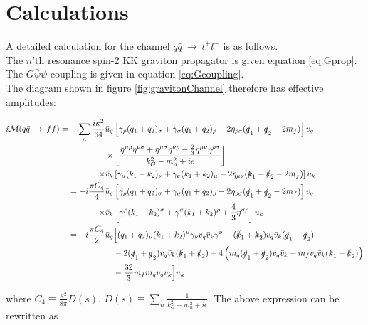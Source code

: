 \documentclass[11pt,a4paper]{article}
\begin{document}
\appendix
\section{Calculations}
A detailed calculation for the channel $q\bar{q}\:\rightarrow\:l^+l^-$ is as follows.\\
The $n$'th resonance spin-2 KK graviton propagator is given equation \ref{eq:Gprop}. The $G\bar{\psi}\psi$-coupling is given in equation \ref{eq:Gcoupling}.\\
The diagram shown in figure \ref{fig:gravitonChannel} therefore has effective amplitudes:

\begin{align}
	\begin{split}
	i\mathcal{M}(q\bar{q}\:\rightarrow\:f\bar{f}) = -\sum_{n}\frac{i\kappa^2}{64}\bar{u}_q&\left[\gamma_\rho(q_1 + q_2)_\sigma + \gamma_\sigma(q_1+q_2)_\rho - 2\eta_{\rho\sigma}(\slashed q_1 + \slashed q_2 - 2m_f)\right]v_q\\
	\times&\left[\frac{\eta^{\mu\rho}\eta^{\nu\sigma} + \eta^{\mu\sigma}\eta^{\nu\rho} - \frac{2}{3}\eta^{\mu\nu}\eta^{\rho\sigma}}{k_G^2 - m_n^2 + i\epsilon}\right]\\
	\times\bar{v}_k&\left[\gamma_\mu(k_1 + k_2)_\nu + \gamma_\nu(k_1+k_2)_\mu - 2\eta_{\mu\nu}(\slashed k_1 + \slashed k_2 - 2m_f)\right]u_k\\
	= -i\frac{\pi C_4}{4}\bar{u}_q&\left[\gamma_\rho(q_1 + q_2)_ \sigma + \gamma_\sigma(q_1+q_2)_\rho - 2\eta_{\rho\sigma}(\slashed q_1 + \slashed q_2 - 2m_f)\right]v_q\\
	\times\bar{v}_k&\left[\gamma^\rho(k_1 + k_2)^\sigma + \gamma^\sigma(k_1+k_2)^\rho + \frac{4}{3}\eta^{\sigma\rho}\right]u_k\\
	= -i\frac{\pi C_4}{2}\bar{u}_q&\Big[(q_1 + q_2)_ \mu(k_1+k_2)^\mu \gamma_\nu v_q\bar{v}_k\gamma^\nu + (\slashed k_1 + \slashed k_2)v_q\bar{v}_k(\slashed q_1 + \slashed q_2)\\
	&- 2(\slashed q_1 + \slashed q_2)v_q\bar{v}_k(\slashed k_1 + \slashed k_2) + 4\left(m_q(\slashed q_1 + \slashed q_2)v_q\bar{v}_k + m_fv_q\bar{v}_k(\slashed k_1 + \slashed k_2)\right)\\
	&- \frac{32}{3}m_fm_qv_q\bar{v}_k\Big]u_k
	\end{split}
\end{align}

 where $C_4 \equiv \frac{\kappa^2}{8\pi} D(s)$, $D(s) \equiv \sum_{n} \frac{1}{k_G^2 - m_n^2 + i\epsilon}$. The above expression can be rewritten as
\end{document}
